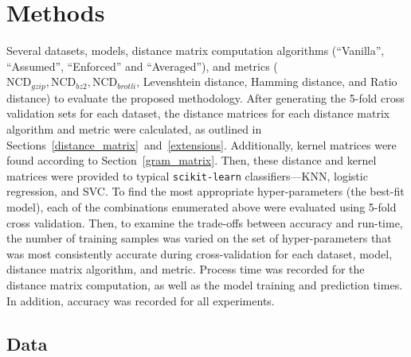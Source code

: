 \documentclass[preprint,12pt]{elsarticle}
\begin{document}
\section{Methods}
\label{methods}

Several datasets, models, distance matrix computation algorithms (``Vanilla'', ``Assumed'', ``Enforced'' and ``Averaged''), and metrics ($\text{NCD}_{gzip}, \text{NCD}_{bz2}, \text{NCD}_{brotli}$, Levenshtein distance, Hamming distance, and Ratio distance) to evaluate the proposed methodology. 
After generating the 5-fold cross validation sets for each dataset, the distance matrices for each distance matrix algorithm and metric were calculated, as outlined in Sections~\ref{distance_matrix}~and~\ref{extensions}.
Additionally, kernel matrices were found according to Section~\ref{gram_matrix}.
Then, these distance and kernel matrices were provided to typical \texttt{scikit-learn} classifiers---KNN, logistic regression, and SVC.
To find the most appropriate hyper-parameters (the best-fit model), each of the combinations enumerated above were evaluated using 5-fold cross validation. 
Then, to examine the trade-offs between accuracy and run-time, the number of training samples was varied on the set of hyper-parameters that was most consistently accurate during cross-validation for each dataset, model, distance matrix algorithm, and metric. 
Process time was recorded for the distance matrix computation, as well as the model training and prediction times. 
In addition, accuracy was recorded for all experiments. 



\subsection{Data}
\label{datasets}
\end{document}
